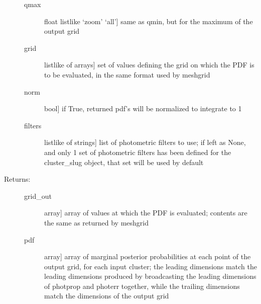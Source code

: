 \documentclass[letterpaper,10pt,english]{sphinxmanual}
\begin{document}
\begin{fulllineitems}
\begin{fulllineitems}
\begin{description}
\begin{description}
\item[{qmax}] \leavevmode{[}float \textbar{} listlike \textbar{} `zoom' \textbar{} `all'{]}
same as qmin, but for the maximum of the output grid

\item[{grid}] \leavevmode{[}listlike of arrays{]}
set of values defining the grid on which the PDF is to
be evaluated, in the same format used by meshgrid

\item[{norm}] \leavevmode{[}bool{]}
if True, returned pdf's will be normalized to integrate
to 1

\item[{filters}] \leavevmode{[}listlike of strings{]}
list of photometric filters to use; if left as None, and
only 1 set of photometric filters has been defined for
the cluster\_slug object, that set will be used by
default

\end{description}

\item[{Returns:}] \leavevmode\begin{description}
\item[{grid\_out}] \leavevmode{[}array{]}
array of values at which the PDF is evaluated; contents
are the same as returned by meshgrid

\item[{pdf}] \leavevmode{[}array{]}
array of marginal posterior probabilities at each point
of the output grid, for each input cluster; the leading
dimensions match the leading dimensions produced by
broadcasting the leading dimensions of photprop and
photerr together, while the trailing dimensions match
the dimensions of the output grid

\end{description}

\end{description}

\end{fulllineitems}



\end{fulllineitems}
\end{document}

